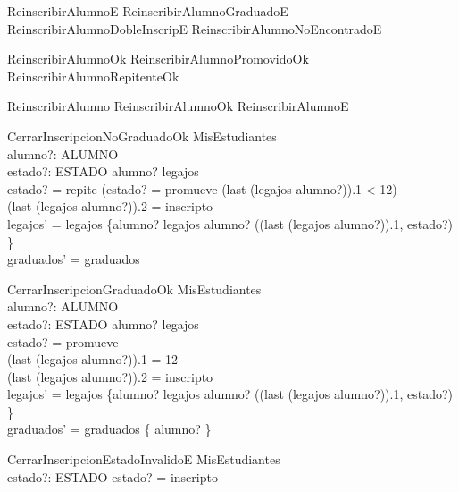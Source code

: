 \begin{zed}
    ReinscribirAlumnoE  ReinscribirAlumnoGraduadoE \lor ReinscribirAlumnoDobleInscripE \lor ReinscribirAlumnoNoEncontradoE
\end{zed}
\begin{zed}
    ReinscribirAlumnoOk  ReinscribirAlumnoPromovidoOk \lor ReinscribirAlumnoRepitenteOk
\end{zed}
\begin{zed}
    ReinscribirAlumno  ReinscribirAlumnoOk \lor ReinscribirAlumnoE
\end{zed}

\begin{schema}{CerrarInscripcionNoGraduadoOk}
    \Delta MisEstudiantes \\
    alumno?: ALUMNO \\
    estado?: ESTADO
    \where
    alumno? \in \dom legajos \\
    estado? = repite \lor (estado? = promueve \land (last (legajos alumno?)).1 < 12) \\
    (last (legajos alumno?)).2 = inscripto \\
    legajos' = legajos \oplus \{alumno? \mapsto legajos alumno? \cat \langle ((last (legajos alumno?)).1, estado?) \rangle\} \\
    graduados' = graduados
\end{schema}

\begin{schema}{CerrarInscripcionGraduadoOk}
    \Delta MisEstudiantes \\
    alumno?: ALUMNO \\
    estado?: ESTADO
    \where
    alumno? \in \dom legajos \\
    estado? = promueve \\
    (last (legajos alumno?)).1 = 12 \\
    (last (legajos alumno?)).2 = inscripto \\
    legajos' = legajos \oplus \{alumno? \mapsto legajos alumno? \cat \langle ((last (legajos alumno?)).1, estado?) \rangle\} \\
    graduados' = graduados \cup \{ alumno? \}
\end{schema}

\begin{schema}{CerrarInscripcionEstadoInvalidoE}
    \Xi MisEstudiantes \\
    estado?: ESTADO
    \where
    estado? = inscripto
\end{schema}

